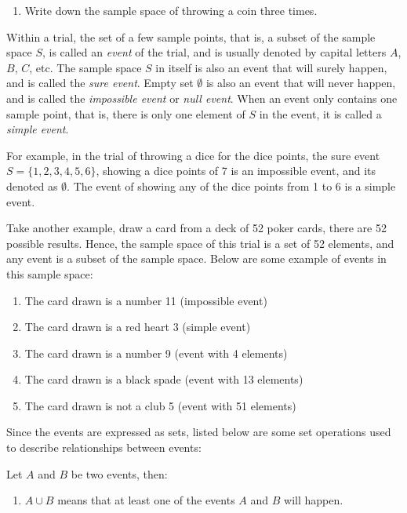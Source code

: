 \documentclass{report}
\begin{document}
\begin{multicols}{2}
\begin{enumerate}
    \item Write down the sample space of throwing a coin three times.
  \end{enumerate}

  Within a trial, the set of a few sample points, that is, a subset of the sample
  space $S$, is called an \emph{event} of the trial, and is usually denoted by
  capital letters $A$, $B$, $C$, etc. The sample space $S$ in itself is also an
  event that will surely happen, and is called the \emph{sure event}. Empty set
  $\emptyset$ is also an event that will never happen, and is called the
  \emph{impossible event} or \emph{null event}. When an event only contains one
  sample point, that is, there is only one element of $S$ in the event, it is
  called a \emph{simple event}.

  For example, in the trial of throwing a dice for the dice points, the sure
  event $S = \{1, 2, 3, 4, 5, 6\}$, showing a dice points of 7 is an impossible
  event, and its denoted as $\emptyset$. The event of showing any of the dice
  points from 1 to 6 is a simple event.

  Take another example, draw a card from a deck of 52 poker cards, there are 52
  possible results. Hence, the sample space of this trial is a set of 52
  elements, and any event is a subset of the sample space. Below are some example
  of events in this sample space:

  \begin{enumerate}
    \item The card drawn is a number 11 (impossible event)
    \item The card drawn is a red heart 3 (simple event)
    \item The card drawn is a number 9 (event with 4 elements)
    \item The card drawn is a black spade (event with 13 elements)
    \item The card drawn is not a club 5 (event with 51 elements)
  \end{enumerate}

  Since the events are expressed as sets, listed below are some set operations
  used to describe relationships between events:

  Let $A$ and $B$ be two events, then:

  \begin{enumerate}
    \item $A \cup B$ means that at least one of the events $A$ and $B$ will happen.


\end{enumerate}
\end{multicols}
\end{document}

